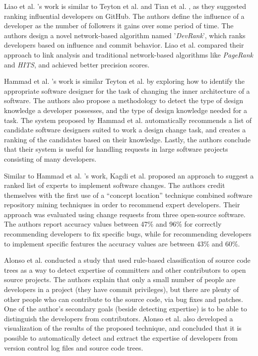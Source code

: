         Liao et al. \cite{liao2017devrank}'s work is similar to Teyton et al. \cite{teyton2013find} and Tian et al. \cite{tian2019geek}, as they suggested ranking influential developers on GitHub. The authors define the influence of a developer as the number of followers it gains over some period of time. The authors design a novel network-based algorithm named '\emph{DevRank}', which ranks developers based on influence and commit behavior. Liao et al. compared their approach to link analysis and traditional network-based algorithms like \emph{PageRank} and \emph{HITS}, and achieved better precision scores.
        
        Hammad et al. \cite{hammad2013identifying}'s work is similar Teyton et al. \cite{teyton2013find} by exploring how to identify the appropriate software designer for the task of changing the inner architecture of a software. The authors also propose a methodology to detect the type of design knowledge a developer possesses, and the type of design knowledge needed for a task. The system proposed by Hammad et al. automatically recommends a list of candidate software designers suited to work a design change task, and creates a ranking of the candidates based on their knowledge. Lastly, the authors conclude that their system is useful for handling requests in large software projects consisting of many developers.
        
        Similar to Hammad et al. \cite{hammad2013identifying}'s work, Kagdi et al. \cite{kagdi2012assigning} proposed an approach to suggest a ranked list of experts to implement software changes. The authors credit themselves with the first use of a ``concept location'' technique combined software repository mining techniques in order to recommend expert developers. Their approach was evaluated using change requests from three open-source software. The authors report accuracy values between 47\% and 96\% for correctly recommending developers to fix specific bugs, while for recommending developers to implement specific features the accuracy values are between 43\% and 60\%.
        
        Alonso et al. \cite{alonso2008expertise} conducted a study that used rule-based classification of source code trees as a way to detect expertise of committers and other contributors to open source projects. The authors explain that only a small number of people are developers in a project (they have commit privileges), but there are plenty of other people who can contribute to the source code, via bug fixes and patches. One of the author's secondary goals (beside detecting expertise) is to be able to distinguish the developers from contributors. Alonso et al. also developed a visualization of the results of the proposed technique, and concluded that it is possible to automatically detect and extract the expertise of developers from version control log files and source code trees.
        
